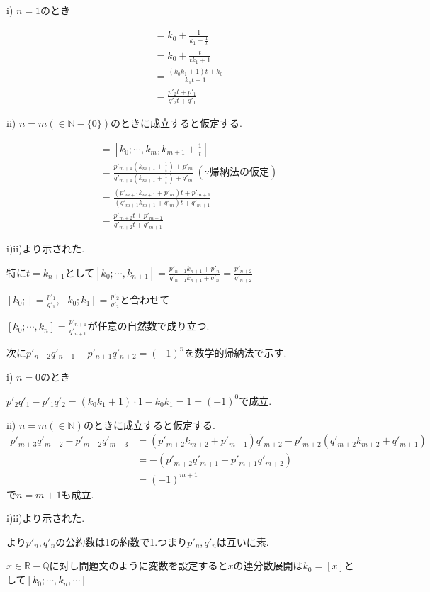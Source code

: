 \documentclass{jsarticle}
\begin{document}
i) $n=1$のとき

\begin{align*}
[k_0;k_1,t]&=k_0+\frac{1}{k_1+\frac{1}{t}}\\
&=k_0+\frac{t}{tk_1+1}\\
&=\frac{(k_0k_1+1)t+k_0}{k_1t+1}\\
&=\frac{p'_2t+p'_1}{q'_2t+q'_1}
\end{align*}

ii) $n=m(\in \mathbb{N}-\{0\})$のときに成立すると仮定する.

\begin{align*}
[k_0;\cdots ,k_{m+1},t]&=[k_0;\cdots ,k_{m},k_{m+1}+\frac{1}{t}]\\
&=\frac{p'_{m+1}(k_{m+1}+\frac{1}{t})+p'_m}{q'_{m+1}(k_{m+1}+\frac{1}{t})+q'_m} \ (\because 帰納法の仮定)\\
&=\frac{(p'_{m+1}k_{m+1}+p'_m)t+p'_{m+1}}{(q'_{m+1}k_{m+1}+q'_m)t+q'_{m+1}}\\
&=\frac{p'_{m+2}t+p'_{m+1}}{q'_{m+2}t+q'_{m+1}}
\end{align*}

i)ii)より示された.

特に$t=k_{n+1}$として$[k_0;\cdots ,k_{n+1}]=\frac{p'_{n+1}k_{n+1}+p'_n}{q'_{n+1}k_{n+1}+q'_n}=\frac{p'_{n+2}}{q'_{n+2}}$

$[k_0;]=\frac{p'_1}{q'_1},[k_0;k_1]=\frac{p'_2}{q'_2}$と合わせて

$[k_0;\cdots ,k_n]=\frac{p'_{n+1}}{q'_{n+1}}$が任意の自然数で成り立つ.

次に$p'_{n+2}q'_{n+1}-p'_{n+1}q'_{n+2}=(-1)^n$を数学的帰納法で示す.

i) $n=0$のとき

$p'_2q'_1-p'_1q'_2=(k_0k_1+1)\cdot 1-k_0k_1=1=(-1)^0$で成立.

ii) $n=m(\in \mathbb{N})$のときに成立すると仮定する.
\begin{align*}
p'_{m+3}q'_{m+2}-p'_{m+2}q'_{m+3}&=(p'_{m+2}k_{m+2}+p'_{m+1})q'_{m+2}-p'_{m+2}(q'_{m+2}k_{m+2}+q'_{m+1})\\
&=-(p'_{m+2}q'_{m+1}-p'_{m+1}q'_{m+2})\\
&=(-1)^{m+1}
\end{align*}
で$n=m+1$も成立.

i)ii)より示された.

より$p'_n,q'_n$の公約数は1の約数で1.つまり$p'_n,q'_n$は互いに素.

$x\in \mathbb{R}-\mathbb{Q}$に対し問題文のように変数を設定すると$x$の連分数展開は$k_0=[x]$として$[k_0;\cdots,k_n,\cdots]$
\end{document}
